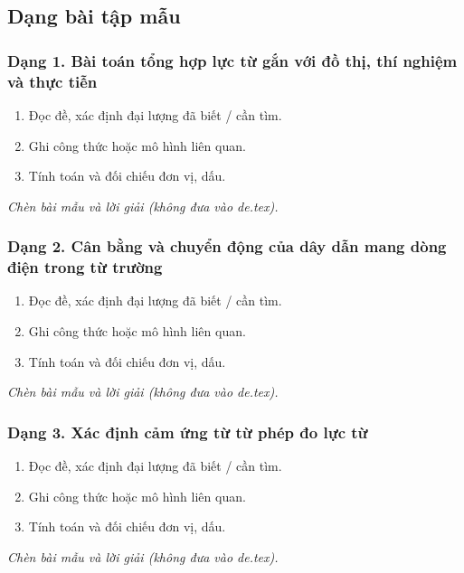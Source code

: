 

\subsection{Dạng bài tập mẫu}
\subsubsection{Dạng 1. Bài toán tổng hợp lực từ gắn với đồ thị, thí nghiệm và thực tiễn}
\begin{phuongphap}
\begin{enumerate}
\item Đọc đề, xác định đại lượng đã biết / cần tìm.
\item Ghi công thức hoặc mô hình liên quan.
\item Tính toán và đối chiếu đơn vị, dấu.
\end{enumerate}
\end{phuongphap}
\begin{vidumau}
\textit{Chèn bài mẫu và lời giải (không đưa vào de.tex).}
\end{vidumau}

\subsubsection{Dạng 2. Cân bằng và chuyển động của dây dẫn mang dòng điện trong từ trường}
\begin{phuongphap}
\begin{enumerate}
\item Đọc đề, xác định đại lượng đã biết / cần tìm.
\item Ghi công thức hoặc mô hình liên quan.
\item Tính toán và đối chiếu đơn vị, dấu.
\end{enumerate}
\end{phuongphap}
\begin{vidumau}
\textit{Chèn bài mẫu và lời giải (không đưa vào de.tex).}
\end{vidumau}

\subsubsection{Dạng 3. Xác định cảm ứng từ từ phép đo lực từ}
\begin{phuongphap}
\begin{enumerate}
\item Đọc đề, xác định đại lượng đã biết / cần tìm.
\item Ghi công thức hoặc mô hình liên quan.
\item Tính toán và đối chiếu đơn vị, dấu.
\end{enumerate}
\end{phuongphap}
\begin{vidumau}
\textit{Chèn bài mẫu và lời giải (không đưa vào de.tex).}
\end{vidumau}

